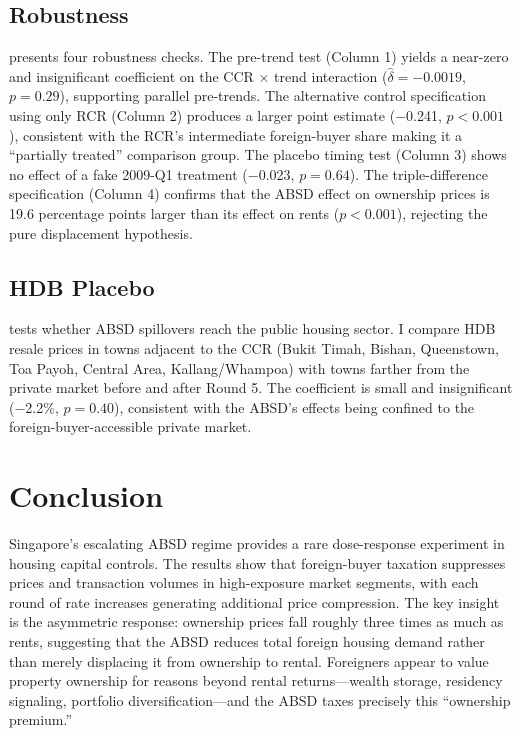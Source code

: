 \documentclass[12pt]{article}
\begin{document}


\subsection{Robustness}

 presents four robustness checks. The pre-trend test (Column 1) yields a near-zero and insignificant coefficient on the CCR $\times$ trend interaction ($\hat{\delta} = -0.0019$, $p = 0.29$), supporting parallel pre-trends. The alternative control specification using only RCR (Column 2) produces a larger point estimate ($-$0.241, $p < 0.001$), consistent with the RCR's intermediate foreign-buyer share making it a ``partially treated'' comparison group. The placebo timing test (Column 3) shows no effect of a fake 2009-Q1 treatment ($-$0.023, $p = 0.64$). The triple-difference specification (Column 4) confirms that the ABSD effect on ownership prices is 19.6 percentage points larger than its effect on rents ($p < 0.001$), rejecting the pure displacement hypothesis.



\subsection{HDB Placebo}

 tests whether ABSD spillovers reach the public housing sector. I compare HDB resale prices in towns adjacent to the CCR (Bukit Timah, Bishan, Queenstown, Toa Payoh, Central Area, Kallang/Whampoa) with towns farther from the private market before and after Round 5. The coefficient is small and insignificant ($-$2.2\%, $p = 0.40$), consistent with the ABSD's effects being confined to the foreign-buyer-accessible private market.



\section{Conclusion}\label{sec:conclusion}

Singapore's escalating ABSD regime provides a rare dose-response experiment in housing capital controls. The results show that foreign-buyer taxation suppresses prices and transaction volumes in high-exposure market segments, with each round of rate increases generating additional price compression. The key insight is the asymmetric response: ownership prices fall roughly three times as much as rents, suggesting that the ABSD reduces total foreign housing demand rather than merely displacing it from ownership to rental. Foreigners appear to value property ownership for reasons beyond rental returns---wealth storage, residency signaling, portfolio diversification---and the ABSD taxes precisely this ``ownership premium.''
\end{document}

